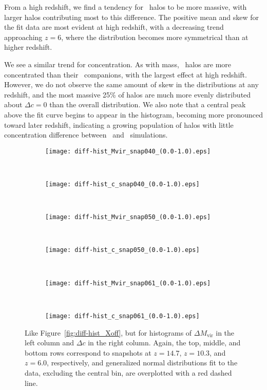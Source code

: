 From a high redshift, we find a tendency for \lpt\ halos to be more massive, with larger halos contributing most to this difference.  The positive mean and skew for the fit data are most evident at high redshift, with a decreasing trend approaching $z = 6$, where the distribution becomes more symmetrical than at higher redshift.  

We see a similar trend for concentration.  As with mass, \lpt\ halos are more concentrated than their \za\ companions, with the largest effect at high redshift.  However, we do not observe the same amount of skew in the distributions at any redshift, and the most massive 25\% of halos are much more evenly distributed about $\Delta c = 0$ than the overall distribution.  We also note that a central peak above the fit curve begins to appear in the histogram, becoming more pronounced toward later redshift, indicating a growing population of halos with little concentration difference between \lpt\ and \za\ simulations.

\begin{figure*}[t]
	\centering
	\begin{subfigure}{}
		\texttt{[image: diff-hist\_Mvir\_snap040\_(0.0-1.0).eps]}
	\end{subfigure}
	~
	\begin{subfigure}{}
		\texttt{[image: diff-hist\_c\_snap040\_(0.0-1.0).eps]}
	\end{subfigure}
	\\
	\begin{subfigure}{}
		\texttt{[image: diff-hist\_Mvir\_snap050\_(0.0-1.0).eps]}
	\end{subfigure}
	~
	\begin{subfigure}{}
		\texttt{[image: diff-hist\_c\_snap050\_(0.0-1.0).eps]}
	\end{subfigure}
	\\
	\begin{subfigure}{}
		\texttt{[image: diff-hist\_Mvir\_snap061\_(0.0-1.0).eps]}
	\end{subfigure}
	~
	\begin{subfigure}{}
		\texttt{[image: diff-hist\_c\_snap061\_(0.0-1.0).eps]}
	\end{subfigure}
	\caption[Histograms of $\Delta M_{\mathrm{vir}}$ and $\Delta c$]{\footnotesize Like Figure~\ref{fig:diff-hist_Xoff}, but for histograms of $\Delta M_{\mathrm{vir}}$ in the left column and $\Delta c$ in the right column.  Again, the top, middle, and bottom rows correspond to snapshots at $z = 14.7$, $z = 10.3$, and $z = 6.0$, respectively, and generalized normal distributions fit to the data, excluding the central bin, are overplotted with a red dashed line.}
	\label{fig:diff-hist_Mvir_c}
\end{figure*}


